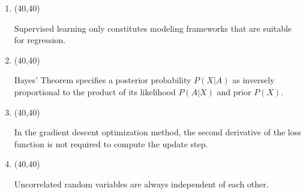 \documentclass[11pt,twoside]{article}
\newcommand{\?}{\stackrel{?}{=}}
\begin{document}
\begin{enumerate}[\bf (i)]

\item \hfill
  \begin{minipage}{.1\linewidth}
    \framebox(40,40){} %
  \end{minipage}\quad
  \begin{minipage}{.85\linewidth}
    Supervised learning only constitutes modeling frameworks that are suitable for regression.
  \end{minipage}

  \smallskip

  \item \hfill
  \begin{minipage}{.1\linewidth}
    \framebox(40,40){} %
  \end{minipage}\quad
  \begin{minipage}{.85\linewidth}
    Bayes' Theorem specifies a posterior probability $P(X|A)$ as inversely proportional to the product of its likelihood
    $P(A|X)$ and prior $P(X)$.
  \end{minipage}

  \smallskip  
  
  \item \hfill
  \begin{minipage}{.1\linewidth}
    \framebox(40,40){} %
  \end{minipage}\quad
  \begin{minipage}{.85\linewidth}
    In the gradient descent optimization method, the second derivative of the loss function is not required to compute
    the update step.
  \end{minipage}

  

 
    \smallskip

\item \hfill
  \begin{minipage}{.1\linewidth}
    \framebox(40,40){} %
  \end{minipage}\quad
  \begin{minipage}{.85\linewidth}
    Uncorrelated random variables are always independent of each other.
  \end{minipage}
  

\end{enumerate}
\end{document}
